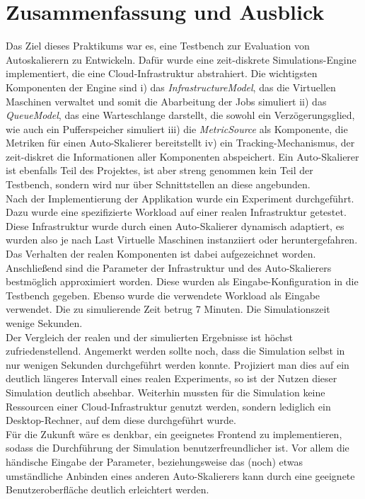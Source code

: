\section{Zusammenfassung und Ausblick}
Das Ziel dieses Praktikums war es, eine Testbench zur Evaluation von Autoskalierern zu Entwickeln. Dafür wurde eine zeit-diskrete Simulations-Engine implementiert, die eine Cloud-Infrastruktur abstrahiert. Die wichtigsten Komponenten der Engine sind i) das \textit{InfrastructureModel}, das die Virtuellen Maschinen verwaltet und somit die Abarbeitung der Jobs simuliert ii) das \textit{QueueModel}, das eine Warteschlange darstellt, die sowohl ein Verzögerungsglied, wie auch ein Pufferspeicher simuliert iii) die \textit{MetricSource} als Komponente, die Metriken für einen Auto-Skalierer bereitstellt iv) ein Tracking-Mechanismus, der zeit-diskret die Informationen aller Komponenten abspeichert. Ein Auto-Skalierer ist ebenfalls Teil des Projektes, ist aber streng genommen kein Teil der Testbench, sondern wird nur über Schnittstellen an diese angebunden. \\
Nach der Implementierung der Applikation wurde ein Experiment durchgeführt. Dazu wurde eine spezifizierte Workload auf einer realen Infrastruktur getestet. Diese Infrastruktur wurde durch einen Auto-Skalierer dynamisch adaptiert, es wurden also je nach Last Virtuelle Maschinen instanziiert oder heruntergefahren. Das Verhalten der realen Komponenten ist dabei aufgezeichnet worden. Anschließend sind die Parameter der Infrastruktur und des Auto-Skalierers bestmöglich approximiert worden. Diese wurden als Eingabe-Konfiguration in die Testbench gegeben. Ebenso wurde die verwendete Workload als Eingabe verwendet. Die zu simulierende Zeit betrug 7 Minuten. Die Simulationszeit wenige Sekunden. \\
Der Vergleich der realen und der simulierten Ergebnisse ist höchst zufriedenstellend. Angemerkt werden sollte noch, dass die Simulation selbst in nur wenigen Sekunden durchgeführt werden konnte. Projiziert man dies auf ein deutlich längeres Intervall eines realen Experiments, so ist der Nutzen dieser Simulation deutlich absehbar. Weiterhin mussten für die Simulation keine Ressourcen einer Cloud-Infrastruktur genutzt werden, sondern lediglich ein Desktop-Rechner, auf dem diese durchgeführt wurde. \\
Für die Zukunft wäre es denkbar, ein geeignetes Frontend zu implementieren, sodass die Durchführung der Simulation benutzerfreundlicher ist. Vor allem die händische Eingabe der Parameter, beziehungsweise das (noch) etwas umständliche Anbinden eines anderen Auto-Skalierers kann durch eine geeignete Benutzeroberfläche deutlich erleichtert werden.










